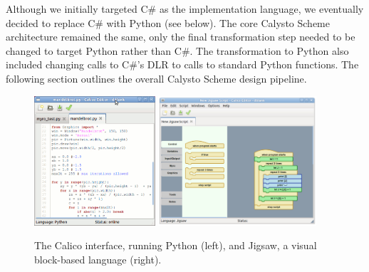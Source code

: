 \documentclass[acmsmall,screen,authorversion]{acmart}
\begin{document}
Although we initially targeted C\# as the implementation language, we
eventually decided to replace C\# with Python (see below). The core Calysto
Scheme architecture remained the same, only the final transformation step
needed to be changed to target Python rather than C\#. The transformation to
Python also included changing calls to C\#'s DLR to calls to standard Python
functions. The following section outlines the overall Calysto Scheme design
pipeline.


\begin{figure}
  \centering
  \includegraphics[width=0.40\textwidth]{calico-interface-python.jpg}
  \hspace{0.15in}
  \includegraphics[width=0.523\textwidth]{calico-interface-jigsaw.jpg}
  \caption{The Calico interface, running Python (left),
    and Jigsaw, a visual block-based language (right).}
  \label{fig:calico}
\end{figure}

\end{document}
